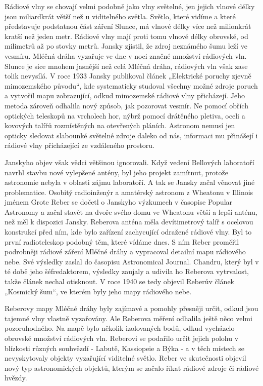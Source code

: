   Rádiové vlny se chovají velmi podobně jako vlny světelné, jen jejich vlnové délky jsou miliardkrát
  větší než u viditelného světla. Světlo, které vidíme a které představuje podstatnou část záření
  Slunce, má vlnové délky více než milionkrát kratší než jeden metr. Rádiové vlny mají proti tomu
  vlnové délky obrovské, od milimetrů až po stovky metrů. Jansky zjistil, že zdroj neznámého šumu
  leží ve vesmíru. Mléčná dráha vyzařuje ve dne v noci značné množství rádiových vln. Slunce je sice
  mnohem jasnější než celá Mléčná dráha, rádiových vln však zase tolik nevysílá. V roce 1933 Jansky
  publikoval článek „Elektrické poruchy zjevně mimozemského původu“, kde systematicky studoval
  všechny možné zdroje poruch a vytvořil mapu zobrazující, odkud mimozemské rádiové vlny přicházejí.
  Jeho metoda zároveň odhalila nový způsob, jak pozorovat vesmír. Ne pomocí obřích optických
  teleskopů na vrcholech hor, nýbrž pomocí drátěného pletiva, oceli a kovových talířů rozmístěných
  na otevřených pláních. Astronom nemusí jen opticky sledovat slabounké světelné zdroje daleko od
  nás, informaci mu přinášejí i rádiové vlny přicházející ze vzdáleného prostoru. 

  Janskyho objev však vědci většinou ignorovali. Když vedení Bellových laboratoří navrhl stavbu nové
  vylepšené antény, byl jeho projekt zamítnut, protože astronomie nebyla v oblasti zájmu laboratoří.
  A tak se Jansky začal věnovat jiné problematice. Osobitý radioinženýr a amatérský astronom z
  Wheatonu v Illinois jménem Grote Reber se dočetl o Janskyho výzkumech v časopise Popular Astronomy
  a začal stavět na dvoře svého domu ve Wheatonu větší a lepší anténu, než měl k dispozici Jansky.
  Reberova anténa měla devítimetrový talíř s ocelovou konstrukcí před ním, kde bylo zařízení
  zachycující odražené rádiové vlny. Byl to první radioteleskop podobný těm, které vídáme dnes. S
  ním Reber proměřil podrobněji rádiové záření Mléčné dráhy a vypracoval detailní mapu rádiového
  nebe. Své výsledky zaslal do časopisu Astronomical Journal. Chandru, který byl v té době jeho
  šéfredaktorem, výsledky zaujaly a udivila ho Reberova vytrvalost, takže článek nechal otisknout. V
  roce 1940 se tedy objevil Reberův článek „Kosmický šum“, ve kterém byly jeho mapy rádiového nebe. 

  Reberovy mapy Mléčné dráhy byly zajímavé a pomohly přesněji určit, odkud jsou tajemné vlny vlastně
  vyzařovány. Ale Reberova měření odhalila ještě něco velmi pozoruhodného. Na mapě bylo několik
  izolovaných bodů, odkud vycházelo obrovské množství rádiových vln. Reberovi se podařilo určit
  jejich polohu v blízkosti různých souhvězdí - Labutě, Kassiopeie a Býka - a v těch místech se
  nevyskytovaly objekty vyzařující viditelné světlo. Reber ve skutečnosti objevil nový typ
  astronomických objektů, kterým se začalo říkat rádiové zdroje či rádiové hvězdy. 

